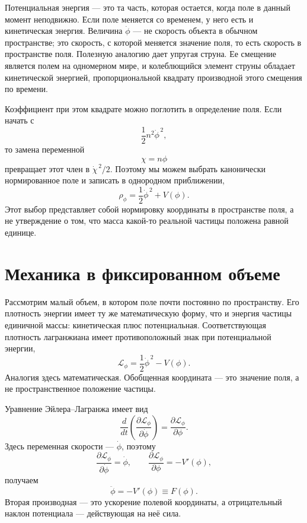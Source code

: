 Потенциальная энергия — это та часть, которая остается, когда поле в данный момент неподвижно. Если поле меняется со временем, у него есть и кинетическая энергия. Величина \(\dot\phi\) — не скорость объекта в обычном пространстве; это скорость, с которой меняется значение поля, то есть скорость в пространстве поля. Полезную аналогию дает упругая струна. Ее смещение является полем на одномерном мире, и колеблющийся элемент струны обладает кинетической энергией, пропорциональной квадрату производной этого смещения по времени.

Коэффициент при этом квадрате можно поглотить в определение поля. Если начать с
\begin{equation}
\frac12 n^2\dot\phi^{\,2},
\end{equation}
то замена переменной
\begin{equation}
\chi=n\phi
\end{equation}
превращает этот член в \(\dot\chi^{\,2}/2\). Поэтому мы можем выбрать канонически нормированное поле и записать в однородном приближении,
\begin{equation}
\rho_\phi=\frac12\dot\phi^{\,2}+V(\phi).
\label{eq:c09-rho-homogeneous}
\end{equation}
Этот выбор представляет собой нормировку координаты в пространстве поля, а не утверждение о том, что масса какой-то реальной частицы положена равной единице.

\section{Механика в фиксированном объеме}

Рассмотрим малый объем, в котором поле почти постоянно по пространству. Его плотность энергии имеет ту же математическую форму, что и энергия частицы единичной массы: кинетическая плюс потенциальная. Соответствующая плотность лагранжиана имеет противоположный знак при потенциальной энергии,
\begin{equation}
\mathcal L_\phi
=\frac12\dot\phi^{\,2}-V(\phi).
\label{eq:c09-lagrangian-density}
\end{equation}
Аналогия здесь математическая. Обобщенная координата — это значение поля, а не пространственное положение частицы.

Уравнение Эйлера--Лагранжа имеет вид
\begin{equation}
\frac{d}{dt}
\left(
\frac{\partial\mathcal L_\phi}{\partial\dot\phi}
\right)
=
\frac{\partial\mathcal L_\phi}{\partial\phi}.
\label{eq:c09-el-fixed}
\end{equation}
Здесь переменная скорости — \(\dot\phi\), поэтому
\begin{equation}
\frac{\partial\mathcal L_\phi}{\partial\dot\phi}=\dot\phi,
\qquad
\frac{\partial\mathcal L_\phi}{\partial\phi}=-V'(\phi),
\end{equation}
получаем
\begin{equation}
\ddot\phi=-V'(\phi)\equiv F(\phi).
\label{eq:c09-fixed-eom}
\end{equation}
Вторая производная — это ускорение полевой координаты, а отрицательный наклон потенциала — действующая на неё сила.

